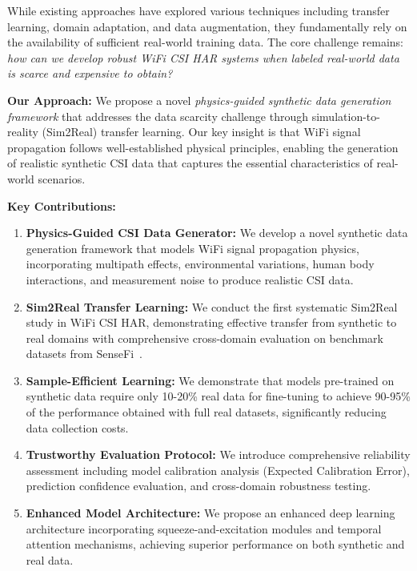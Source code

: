 \documentclass[journal]{IEEEtran}
\begin{document}
While existing approaches have explored various techniques including transfer learning, domain adaptation, and data augmentation, they fundamentally rely on the availability of sufficient real-world training data. The core challenge remains: \textit{how can we develop robust WiFi CSI HAR systems when labeled real-world data is scarce and expensive to obtain?}

\textbf{Our Approach:} We propose a novel \textit{physics-guided synthetic data generation framework} that addresses the data scarcity challenge through simulation-to-reality (Sim2Real) transfer learning. Our key insight is that WiFi signal propagation follows well-established physical principles, enabling the generation of realistic synthetic CSI data that captures the essential characteristics of real-world scenarios.

\textbf{Key Contributions:}
\begin{enumerate}
\item \textbf{Physics-Guided CSI Data Generator:} We develop a novel synthetic data generation framework that models WiFi signal propagation physics, incorporating multipath effects, environmental variations, human body interactions, and measurement noise to produce realistic CSI data.

\item \textbf{Sim2Real Transfer Learning:} We conduct the first systematic Sim2Real study in WiFi CSI HAR, demonstrating effective transfer from synthetic to real domains with comprehensive cross-domain evaluation on benchmark datasets from SenseFi~\cite{yang2023sensefi}.

\item \textbf{Sample-Efficient Learning:} We demonstrate that models pre-trained on synthetic data require only 10-20\% real data for fine-tuning to achieve 90-95\% of the performance obtained with full real datasets, significantly reducing data collection costs.

\item \textbf{Trustworthy Evaluation Protocol:} We introduce comprehensive reliability assessment including model calibration analysis (Expected Calibration Error), prediction confidence evaluation, and cross-domain robustness testing.

\item \textbf{Enhanced Model Architecture:} We propose an enhanced deep learning architecture incorporating squeeze-and-excitation modules and temporal attention mechanisms, achieving superior performance on both synthetic and real data.
\end{enumerate}
\end{document}
